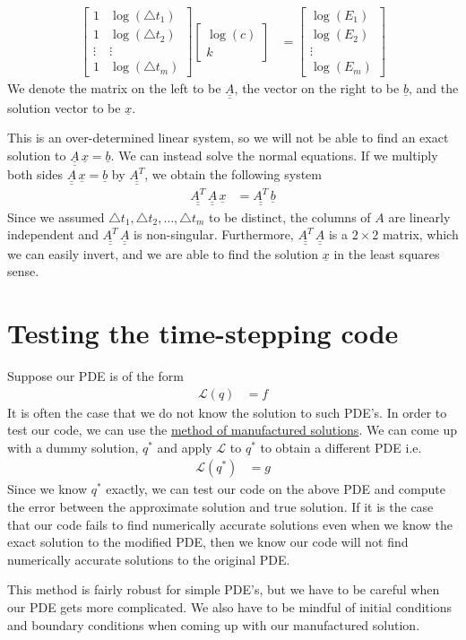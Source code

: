 \documentclass[12pt]{article}
\newcommand{\bunderline}[1]{\underline{#1}}
\renewcommand{\vec}[1]{{\bunderline{#1}}}
\newcommand{\mat}[1]{{\bunderline{\bunderline{#1}}}}
\begin{document}
\begin{align*}
	\begin{bmatrix}
		1 & \log(\triangle t_{1}) \\
		1 & \log(\triangle t_{2}) \\
		\vdots & \vdots \\
		1 & \log(\triangle t_{m})
	\end{bmatrix}
	\begin{bmatrix}
		\log(c) \\
		k
	\end{bmatrix}
	& = 
	\begin{bmatrix}
		\log(E_{1}) \\
		\log(E_{2}) \\
		\vdots \\
		\log(E_{m})
	\end{bmatrix}
\end{align*}
We denote the matrix on the left to be $\mat{A}$, the vector on the right to be $\vec{b}$, and the solution vector to be $\vec{x}$.
\par 
This is an over-determined linear system, so we will not be able to find an exact solution to $\mat{A} \, \vec{x} = \vec{b}$.
We can instead solve the normal equations.
If we multiply both sides $\mat{A} \, \vec{x} = \vec{b}$ by $\mat{A^{T}}$, we obtain the following system
\begin{align*}
	\mat{A^{T}} \, \mat{A} \, \vec{x} & = \mat{A^{T}} \, \vec{b}
\end{align*}
Since we assumed  $\triangle t_{1}, \triangle t_{2}, \hdots, \triangle t_{m}$ to be distinct, the columns of $A$ are linearly independent and $\mat{A^{T}} \, \mat{A}$ is non-singular.
Furthermore, $\mat{A^{T}} \, \mat{A}$ is a $2 \times 2$ matrix, which we can easily invert, and we are able to find the solution $\vec{x}$ in the least squares sense.

\section*{Testing the time-stepping code}
Suppose our PDE is of the form 
\begin{align*}
	\mathcal{L}(q) & = f
\end{align*}
It is often the case that we do not know the solution to such PDE's.
In order to test our code, we can use the \underline{method of manufactured solutions}.
We can come up with a dummy solution, $q^{*}$ and apply $\mathcal{L}$ to $q^{*}$ to obtain a different PDE i.e.
\begin{align*}
	\mathcal{L}(q^{*}) & = g
\end{align*}
Since we know $q^{*}$ exactly, we can test our code on the above PDE and compute the error between the approximate solution and true solution.
If it is the case that our code fails to find numerically accurate solutions even when we know the exact solution to the modified PDE, then we know our code will not find numerically accurate solutions to the original PDE. 
\par
This method is fairly robust for simple PDE's, but we have to be careful when our PDE gets more complicated. 
We also have to be mindful of initial conditions and boundary conditions when coming up with our manufactured solution.	
\end{document}
